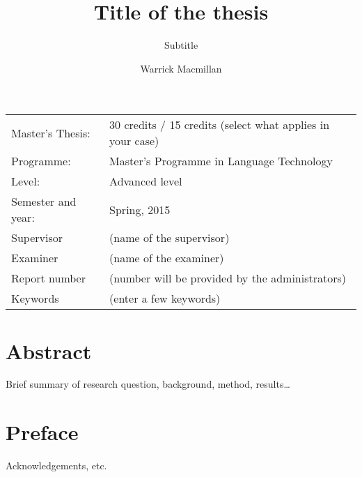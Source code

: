 \documentclass[11pt, a4paper]{article}
\title{Title of the thesis}
\subtitle{Subtitle}
\author{Warrick Macmillan}
\begin{document}
\begin{titlepage}

\maketitle

\vfill

\begingroup
\renewcommand*{\arraystretch}{1.2}
\begin{tabular}{l@{\hskip 20mm}l}
\hline
Master's Thesis: & 30 credits / 15 credits (select what applies in your case)\\
Programme: & Master’s Programme in Language Technology\\
Level: & Advanced level \\
Semester and year: & Spring, 2015\\
Supervisor & (name of the supervisor)\\
Examiner & (name of the examiner)\\
Report number & (number will be provided by the administrators) \\
Keywords & (enter a few keywords) 
\end{tabular}
\endgroup

\thispagestyle{empty}
\end{titlepage}

\newpage
\singlespacing
\section*{Abstract}

Brief summary of research question, background, method, results\ldots

\thispagestyle{empty}

\newpage
\section*{Preface}

Acknowledgements, etc.

\thispagestyle{empty}
\end{document}
